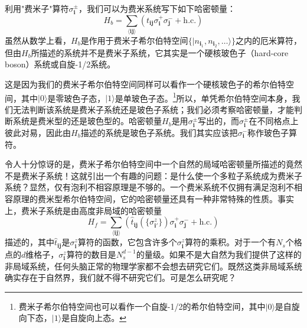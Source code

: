 利用"费米子"算符$\sigma_{\pmb{i}}^{\pm}$，我们可以为费米系统写下如下哈密顿量：
\begin{equation*}
H_b=\sum_{\langle\pmb{i}\pmb{j}\rangle}(t_{\pmb{i}\pmb{j}}\sigma_{\pmb{i}}^{+}\sigma_{\pmb{j}}^{-}+\text{h.c.})
\end{equation*}
虽然从数学上看，$H_b$是作用于费米子希尔伯特空间$\{|n_{\pmb{i}_1},n_{\pmb{i}_2},\ldots\rangle\}$之内的厄米算符，但由$H_b$所描述的系统并不是费米子系统，它其实是一个硬核玻色子（hard-core boson）系统或自旋-1/2系统。

这是因为我们的费米子希尔伯特空间同样可以看作一个硬核玻色子的希尔伯特空间，其中$|0\rangle$是零玻色子态，$|1\rangle$是单玻色子态。\footnote{费米子希尔伯特空间也可以看作一个自旋-1/2的希尔伯特空间，其中$|0\rangle$是自旋向下态，$|1\rangle$是自旋向上态。}所以，单凭希尔伯特空间本身，我们无法判断该系统是费米子系统还是玻色子系统；我们必须考察哈密顿量，才能判断系统是费米型的还是玻色型的。哈密顿量$H_b$是用$\sigma_{\pmb{i}}^{\pm}$写出的，而$\sigma_{\pmb{i}}^{\pm}$在不同格点上彼此对易，因此由$H_b$描述的系统是玻色子系统。我们其实应该把$\sigma_{\pmb{i}}^{-}$称作玻色子算符。

令人十分惊讶的是，费米子希尔伯特空间中一个自然的局域哈密顿量所描述的竟然不是费米子系统！这就引出一个有趣的问题：是什么使一个多粒子系统成为费米子系统？显然，仅有泡利不相容原理是不够的。一个费米系统不仅拥有满足泡利不相容原理的费米型希尔伯特空间，它的哈密顿量还具有一种非常特殊的性质。事实上，费米子系统是由高度非局域的哈密顿量
\begin{equation*}
H_f=\sum_{\langle\pmb{i}\pmb{j}\rangle}(\hat{t}_{\pmb{i}\pmb{j}}(\{\sigma_{\pmb{i}'}^{z}\})\sigma_{\pmb{i}}^{+}\sigma_{\pmb{j}}^{-}+\text{h.c.})
\end{equation*}
描述的，其中$\hat{t}_{\pmb{i}\pmb{j}}$是$\sigma_{\pmb{i}}^{z}$算符的函数，它包含许多个$\sigma_{\pmb{i}}^{z}$算符的乘积。对于一个有$N_s$个格点的$d$维格子，$\sigma_{\pmb{i}}^{z}$算符的数目是$N_s^{d-1}$的量级。如果不是大自然为我们提供了这样的非局域系统，任何头脑正常的物理学家都不会想去研究它们。既然这类非局域系统确实存在于自然界，我们就不得不研究它们。可是怎么研究呢？

